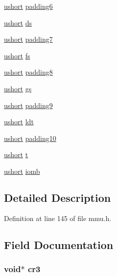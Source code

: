 \begin{DoxyCompactItemize}
\item 
\hyperlink{types_8h_ab95f123a6c9bcfee6a343170ef8c5f69}{ushort} \hyperlink{structtaskstate_a79f9b7c8cb0db73082d203bd85b262b7}{padding6}
\item 
\hyperlink{types_8h_ab95f123a6c9bcfee6a343170ef8c5f69}{ushort} \hyperlink{structtaskstate_a0d354e57548a3fa1b2f8ab075a9bcb7e}{ds}
\item 
\hyperlink{types_8h_ab95f123a6c9bcfee6a343170ef8c5f69}{ushort} \hyperlink{structtaskstate_a8b3bd31ca992c4eec6bf4827d115e071}{padding7}
\item 
\hyperlink{types_8h_ab95f123a6c9bcfee6a343170ef8c5f69}{ushort} \hyperlink{structtaskstate_a5f3d679db589770026f3d927f3fed7b7}{fs}
\item 
\hyperlink{types_8h_ab95f123a6c9bcfee6a343170ef8c5f69}{ushort} \hyperlink{structtaskstate_ae2ae739432db50973be3ad877bd1e109}{padding8}
\item 
\hyperlink{types_8h_ab95f123a6c9bcfee6a343170ef8c5f69}{ushort} \hyperlink{structtaskstate_aaeba1ea8da31d7740b55bc9d8efcacc5}{gs}
\item 
\hyperlink{types_8h_ab95f123a6c9bcfee6a343170ef8c5f69}{ushort} \hyperlink{structtaskstate_ad623705de2c5edc604acd86510f30331}{padding9}
\item 
\hyperlink{types_8h_ab95f123a6c9bcfee6a343170ef8c5f69}{ushort} \hyperlink{structtaskstate_a1cef9a62d2a7bec301cd750e9dad4753}{ldt}
\item 
\hyperlink{types_8h_ab95f123a6c9bcfee6a343170ef8c5f69}{ushort} \hyperlink{structtaskstate_a0e4fcccb122d695f00f5df0ad14e6c3b}{padding10}
\item 
\hyperlink{types_8h_ab95f123a6c9bcfee6a343170ef8c5f69}{ushort} \hyperlink{structtaskstate_a9b8e73e27617f93d7f09ec6cf4fe15ea}{t}
\item 
\hyperlink{types_8h_ab95f123a6c9bcfee6a343170ef8c5f69}{ushort} \hyperlink{structtaskstate_a82c42ef4aa57a3f121cc73f016e56f50}{iomb}
\end{DoxyCompactItemize}


\subsection{Detailed Description}


Definition at line 145 of file mmu.\-h.



\subsection{Field Documentation}
\hypertarget{structtaskstate_a915afcdc183379971c3d7f5d665017c6}{
\subsubsection[{cr3}]{\setlength{\rightskip}{0pt plus 5cm}void$\ast$ cr3}}\label{structtaskstate_a915afcdc183379971c3d7f5d665017c6}



